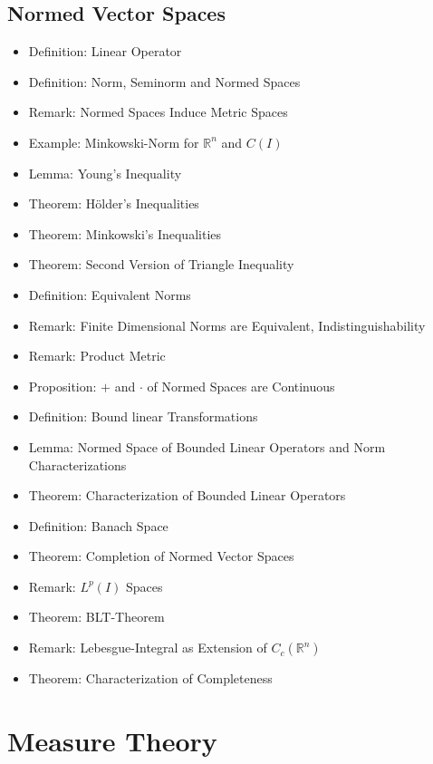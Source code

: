 \documentclass[8pt,twocolumn]{article}
\begin{document}
    \subsection{Normed Vector Spaces} %
    \label{sub:normed_vector_spaces}
      \begin{itemize}
        \item Definition: Linear Operator
        \item Definition: Norm, Seminorm and Normed Spaces
        \item Remark: Normed Spaces Induce Metric Spaces
        \item Example: Minkowski-Norm for $\mathds{R}^n$ and $C(I)$
        \item Lemma: Young's Inequality
        \item Theorem: Hölder's Inequalities
        \item Theorem: Minkowski's Inequalities
        \item Theorem: Second Version of Triangle Inequality
        \item Definition: Equivalent Norms
        \item Remark: Finite Dimensional Norms are Equivalent, Indistinguishability
        \item Remark: Product Metric
        \item Proposition: $+$ and $\cdot$ of Normed Spaces are Continuous
        \item Definition: Bound linear Transformations
        \item Lemma: Normed Space of Bounded Linear Operators and Norm Characterizations
        \item Theorem: Characterization of Bounded Linear Operators
        \item Definition: Banach Space
        \item Theorem: Completion of Normed Vector Spaces
        \item Remark: $L^p(I)$ Spaces
        \item Theorem: BLT-Theorem
        \item Remark: Lebesgue-Integral as Extension of $C_c(\mathds{R}^n)$
        \item Theorem: Characterization of Completeness
      \end{itemize}

  \section{Measure Theory} %
  \label{sec:measure_and_integration_theory}
\end{document}
